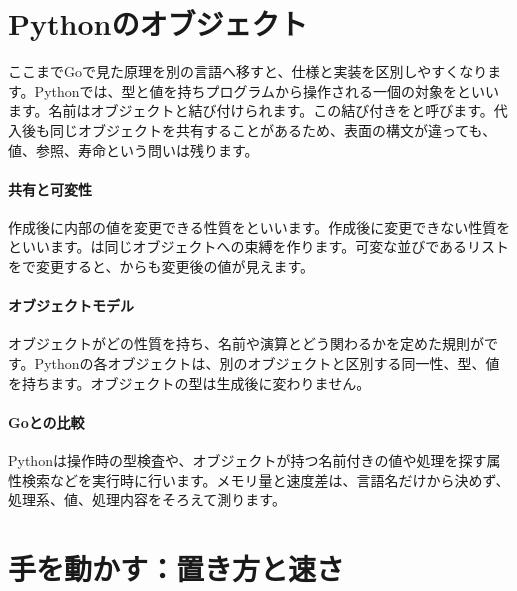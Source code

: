 \section{Pythonのオブジェクト}
\label{sec:03-runtime-data-18}

ここまでGoで見た原理を別の言語へ移すと、仕様と実装を区別しやすくなります。Pythonでは、型と値を持ちプログラムから操作される一個の対象をといいます。名前はオブジェクトと結び付けられます。この結び付きをと呼びます。代入後も同じオブジェクトを共有することがあるため、表面の構文が違っても、値、参照、寿命という問いは残ります。

\begingroup
\begingroup
      \centering
      \vspace{4mm}
\paragraph{共有と可変性}
        作成後に内部の値を変更できる性質をといいます。作成後に変更できない性質をといいます。は同じオブジェクトへの束縛を作ります。可変な並びであるリストをで変更すると、からも変更後の値が見えます。

\par
\endgroup
\medskip
\begingroup
\paragraph{オブジェクトモデル}
        オブジェクトがどの性質を持ち、名前や演算とどう関わるかを定めた規則がです。Pythonの各オブジェクトは、別のオブジェクトと区別する同一性、型、値を持ちます。オブジェクトの型は生成後に変わりません。

\paragraph{Goとの比較}
        Pythonは操作時の型検査や、オブジェクトが持つ名前付きの値や処理を探す属性検索などを実行時に行います。メモリ量と速度差は、言語名だけから決めず、処理系、値、処理内容をそろえて測ります。

\par
\endgroup
\par
\endgroup


\section{手を動かす：置き方と速さ}
\label{sec:03-runtime-data-19}

